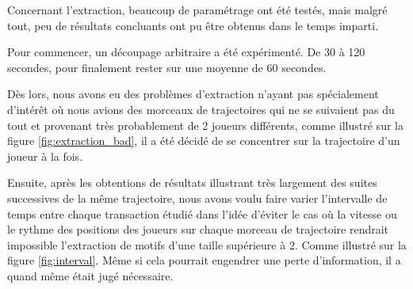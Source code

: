 Concernant l'extraction, beaucoup de paramétrage ont été testés, mais malgré tout, peu de résultats concluants ont pu être obtenus dans le temps imparti. 

Pour commencer, un découpage arbitraire a été expérimenté. De 30 à 120 secondes, pour finalement rester sur une moyenne de 60 secondes. 

Dès lors, nous avons eu des problèmes d'extraction n'ayant pas spécialement d'intérêt où nous avions des morceaux de trajectoires qui ne se suivaient pas du tout et provenant très probablement de 2 joueurs différents, comme illustré sur la figure \ref{fig:extraction_bad}, il a été décidé de se concentrer sur la trajectoire d'un joueur à la fois.

Ensuite, après les obtentions de résultats illustrant très largement des suites successives de la même trajectoire, nous avons voulu faire varier l'intervalle de temps entre chaque transaction étudié dans l'idée d'éviter le cas où la vitesse ou le rythme des positions des joueurs sur chaque morceau de trajectoire rendrait impossible l'extraction de motifs d'une taille supérieure à 2. Comme illustré sur la figure \ref{fig:interval}. Même si cela pourrait engendrer une perte d'information, il a quand même était jugé nécessaire.

